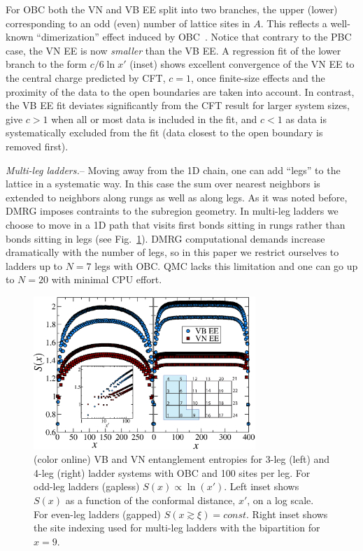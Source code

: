 \documentclass[prl,aps,twocolumn,floatfix,amsmath,amssymb,superscriptaddress,tightenlines]{revtex4}
\begin{document}
For OBC both the VN and VB EE split into two branches, the upper (lower)
corresponding to an odd (even) number of lattice sites in $A$.  This
reflects a well-known ``dimerization'' effect induced by OBC~\cite{Ian1}.
Notice that contrary to the PBC case, the VN EE is now \textit{smaller}
than the VB EE. A regression fit of the lower branch to the form $c/6 \ln
{x'}$ (inset) shows excellent convergence of the VN EE to the central
charge predicted by CFT, $c=1$, once finite-size effects and the proximity
of the data to the open boundaries are taken into account.  In contrast,
the VB EE fit deviates significantly from the CFT result for larger system
sizes, give $c>1$ when all or most data is included in the fit, and $c<1$
as data is systematically excluded from the fit (data closest to the open
boundary is removed first).

{\it Multi-leg ladders.}-- Moving away from the 1D chain, one can add
``legs'' to the lattice in a systematic way. In this case the sum over
nearest neighbors is extended to neighbors along rungs as well as along
legs.  As it was noted before, DMRG imposes contraints to the subregion
geometry. In multi-leg ladders we choose to move in a 1D path that visits
first bonds sitting in rungs rather than bonds sitting in legs (see
Fig.~\ref{ladder}).  DMRG computational demands increase dramatically with
the number of legs, so in this paper we restrict ourselves to ladders up
to $N=7$ legs with OBC. QMC lacks this limitation and one can
go up to $N=20$ with minimal CPU effort.

\begin{figure} { \includegraphics[width=3.3in]{FIG23NEW.eps}
\caption{(color online) VB and VN entanglement entropies for 3-leg (left)
and 4-leg (right) ladder systems with OBC and 100 sites per leg.  For
odd-leg ladders (gapless) $S(x)\propto\ln(x')$.  Left
inset shows $S(x)$ as a function of the conformal distance, $x'$, on a log
scale. For even-leg ladders (gapped) $S(x\gtrsim\xi)=const.$
Right inset shows the site indexing used for multi-leg ladders with the
bipartition for $x=9$.  \label{ladder} }} \end{figure}
\end{document}
